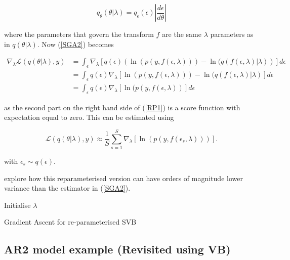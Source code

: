 \documentclass{article}\usepackage[]{graphicx}\usepackage[]{color}
\numberwithin{equation}{section}
\begin{document}
$$q_\theta(\theta | \lambda) = q_\epsilon(\epsilon) \left| \frac{d\epsilon}{d\theta} \right| $$

where the parameters that govern the transform $f$ are the same $\lambda$ parameters as in $q(\theta | \lambda)$. Now (\ref{SGA2}) becomes

\begin{align}
\nabla_{\lambda} \mathcal{L}(q(\theta | \lambda), y) &=  \int_{\epsilon} \nabla_{\lambda}[  q(\epsilon) \left( \ln (p(y, f(\epsilon, \lambda))) - \ln(q(f(\epsilon, \lambda) | \lambda) \right)] d\epsilon \nonumber \\
&=  \int_{\epsilon}  q(\epsilon) \nabla_{\lambda} \left[ \ln (p(y, f(\epsilon, \lambda))) - \ln(q(f(\epsilon, \lambda)| \lambda) \right] d\epsilon \label{RP1} \\
&= \int_{\epsilon}  q(\epsilon) \nabla_{\lambda} \left[ \ln (p(y, f(\epsilon, \lambda)) \right] d\epsilon\nonumber
\end{align}

as the second part on the right hand side of (\ref{RP1}) is a score function with expectation equal to zero. This can be estimated using 

\begin{equation}
\label{RP2}
 \mathcal{L}(q(\theta | \lambda), y) \approx  \frac{1}{S}\sum_{s=1}^{S} \nabla_{\lambda} \left[ \ln (p(y, f(\epsilon_s, \lambda))) \right].
\end{equation}

with $\epsilon_s \sim q(\epsilon)$.

\citet{Kingma2015} explore how this reparameterised version can have orders of magnitude lower variance than the estimator in (\ref{SGA2}).

\begin{algorithm}[H]
 Initialise $\lambda$\;
 \caption{Gradient Ascent for re-parameterised SVB}
  \label{alg:algorithm4}
\end{algorithm}

\subsection{AR2 model example (Revisited using VB)}
\end{document}

